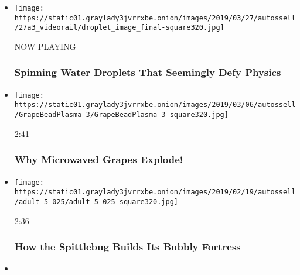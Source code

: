 \begin{itemize}
\item
  \texttt{[image: https://static01.graylady3jvrrxbe.onion/images/2019/03/27/autossell/27a3\_videorail/droplet\_image\_final-square320.jpg]}

  NOW PLAYING

  \hypertarget{spinning-water-droplets-that-seemingly-defy-physics-2}{%
  \subsubsection{Spinning Water Droplets That Seemingly Defy
  Physics}\label{spinning-water-droplets-that-seemingly-defy-physics-2}}
\item
  \href{https://www.nytimes3xbfgragh.onion/video/science/100000006374883/why-microwaved-grapes-explode.html?action=click\&module=video-series-bar\&region=header\&pgtype=Article\&playlistId=video/sciencetake}{}

  \texttt{[image: https://static01.graylady3jvrrxbe.onion/images/2019/03/06/autossell/GrapeBeadPlasma-3/GrapeBeadPlasma-3-square320.jpg]}

  2:41

  \hypertarget{why-microwaved-grapes-explode}{%
  \subsubsection{Why Microwaved Grapes
  Explode!}\label{why-microwaved-grapes-explode}}
\item
  \href{https://www.nytimes3xbfgragh.onion/video/science/100000006346172/how-the-spittlebug-builds-its-bubbly-fortress.html?action=click\&module=video-series-bar\&region=header\&pgtype=Article\&playlistId=video/sciencetake}{}

  \texttt{[image: https://static01.graylady3jvrrxbe.onion/images/2019/02/19/autossell/adult-5-025/adult-5-025-square320.jpg]}

  2:36

  \hypertarget{how-the-spittlebug-builds-its-bubbly-fortress}{%
  \subsubsection{How the Spittlebug Builds Its Bubbly
  Fortress}\label{how-the-spittlebug-builds-its-bubbly-fortress}}
\item
  \href{https://www.nytimes3xbfgragh.onion/video/science/100000006321699/how-the-hummingbird-bill-evolved-for-battle.html?action=click\&module=video-series-bar\&region=header\&pgtype=Article\&playlistId=video/sciencetake}{}


\end{itemize}
